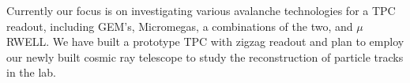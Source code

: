 Currently our focus is on investigating various avalanche technologies for a TPC readout, including GEM’s, Micromegas, a combinations of the two, and $\mu$RWELL. We have built a prototype TPC with zigzag readout and plan to employ our newly built cosmic ray telescope to study the reconstruction of particle tracks in the lab. 

